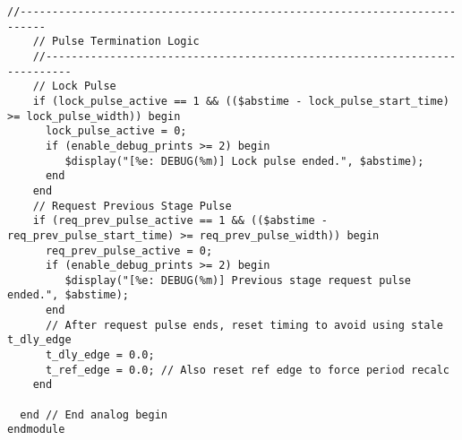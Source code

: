 \begin{lstlisting}[caption={Verilog-A Generic Vb Tuner Implementation}]
    //--------------------------------------------------------------------------
    // Pulse Termination Logic
    //--------------------------------------------------------------------------
    // Lock Pulse
    if (lock_pulse_active == 1 && (($abstime - lock_pulse_start_time) >= lock_pulse_width)) begin
      lock_pulse_active = 0;
      if (enable_debug_prints >= 2) begin
         $display("[%e: DEBUG(%m)] Lock pulse ended.", $abstime);
      end
    end
    // Request Previous Stage Pulse
    if (req_prev_pulse_active == 1 && (($abstime - req_prev_pulse_start_time) >= req_prev_pulse_width)) begin
      req_prev_pulse_active = 0;
      if (enable_debug_prints >= 2) begin
         $display("[%e: DEBUG(%m)] Previous stage request pulse ended.", $abstime);
      end
      // After request pulse ends, reset timing to avoid using stale t_dly_edge
      t_dly_edge = 0.0;
      t_ref_edge = 0.0; // Also reset ref edge to force period recalc
    end

  end // End analog begin
endmodule

\end{lstlisting}